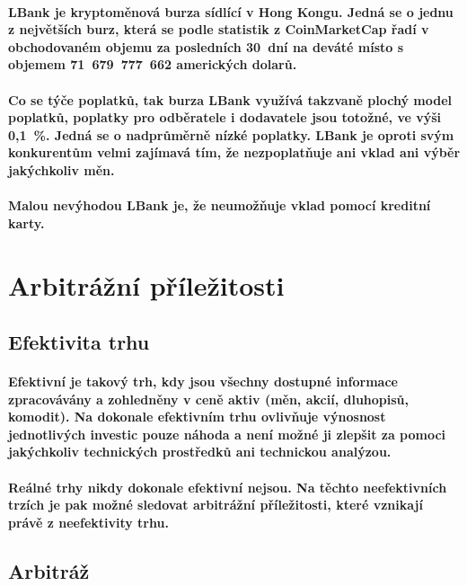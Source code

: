 \documentclass[thesis=B,czech]{FITthesis}[2019/03/21]
\begin{document}
\paragraph{
LBank je kryptoměnová burza sídlící v Hong Kongu. Jedná se o jednu z největších burz, která se podle statistik z CoinMarketCap řadí v obchodovaném objemu za posledních 30~dní na deváté místo s objemem 71~679~777~662 amerických dolarů. \cite{coinmarketcap} \cite{cryptowisser_lbank}
}
\paragraph{
Co se týče poplatků, tak burza LBank využívá takzvaně plochý model poplatků, poplatky pro odběratele i dodavatele jsou totožné, ve výši 0,1~\%. Jedná se o nadprůměrně nízké poplatky. LBank je oproti svým konkurentům velmi zajímavá tím, že nezpoplatňuje ani vklad ani výběr jakýchkoliv měn. 
}
\paragraph{
Malou nevýhodou LBank je, že neumožňuje vklad pomocí kreditní karty. \cite{cryptowisser_lbank}
}

\section{Arbitrážní příležitosti}
\subsection{Efektivita trhu}
\paragraph{
Efektivní je takový trh, kdy jsou všechny dostupné informace zpracovávány a zohledněny v ceně aktiv (měn, akcií, dluhopisů, komodit). Na dokonale efektivním trhu ovlivňuje výnosnost jednotlivých investic pouze náhoda a není možné ji zlepšit za pomoci jakýchkoliv technických prostředků ani technickou analýzou. \cite{efektivita_trhu}
}
\paragraph{
Reálné trhy nikdy dokonale efektivní nejsou. Na těchto neefektivních trzích je pak možné sledovat arbitrážní příležitosti, které vznikají právě z neefektivity trhu. \cite{what_is_arbitage}
}
\subsection{Arbitráž}
\end{document}
